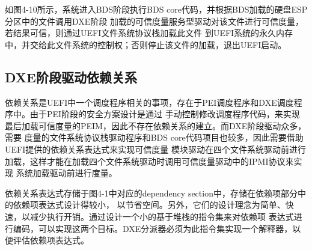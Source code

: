 如图4-10所示，系统进入BDS阶段执行BDS core代码，并根据BDS加载的硬盘ESP分区中的文件调用DXE阶段
加载的可信度量服务型驱动对该文件进行可信度量，若结果可信，则通过UEFI文件系统协议栈加载此文件
到UEFI系统的永久内存中，并交给此文件系统的控制权；否则停止该文件的加载，退出UEFI启动。


\subsection{DXE阶段驱动依赖关系}
依赖关系是UEFI中一个调度程序相关的事项，存在于PEI调度程序和DXE调度程序中。由于PEI阶段的安全方案设计是通过
手动控制修改调度程序代码，来实现最后加载可信度量的PEIM，因此不存在依赖关系的建立。而DXE阶段驱动众多，需要
度量的文件系统协议栈驱动程序和BDS core代码项目也较多，因此需要借助UEFI提供的依赖关系表达式来实现可信度量
模块驱动在四个文件系统驱动前进行加载，这样才能在加载四个文件系统驱动时调用可信度量驱动中的IPMI协议来实现
系统加载驱动前进行度量。
\par 依赖关系表达式存储于图4-1中对应的dependency section中，存储在依赖项部分中的依赖项表达式设计得较小，
以节省空间。另外，它们的设计理念为简单、快速，以减少执行开销。通过设计一个小的基于堆栈的指令集来对依赖项
表达式进行编码，可以实现这两个目标。DXE分派器必须为此指令集实现一个解释器，以便评估依赖项表达式。

